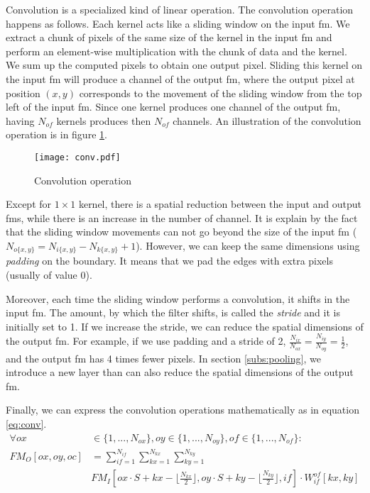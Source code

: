 Convolution is a specialized kind of linear operation. The convolution operation happens as follows. Each kernel acts like a sliding window on the input \acrshort{fm}. We extract a chunk of pixels of the same size of the kernel in the input \acrshort{fm} and perform an element-wise multiplication with the chunk of data and the kernel. We sum up the computed pixels to obtain one output pixel. Sliding this kernel on the input \acrshort{fm} will produce a channel of the output \acrshort{fm}, where the output pixel at position $(x, y)$ corresponds to the movement of the sliding window from the top left of the input \acrshort{fm}. Since one kernel produces one channel of the output \acrshort{fm}, having $N_{of}$ kernels produces then $N_{of}$ channels. An illustration of the convolution operation is in figure \ref{fig:convolution}.
%
\begin{figure}
    \centering
    \texttt{[image: conv.pdf]}
    \caption{Convolution operation}
    \label{fig:convolution}
\end{figure}

Except for $1 \times 1$ kernel, there is a spatial reduction between the input and output \acrshort{fm}s, while there is an increase in the number of channel. It is explain by the fact that the sliding window movements can not go beyond the size of the input \acrshort{fm} ($N_{o\{x,y\}} = N_{i\{x,y\}} - N_{k\{x,y\}} + 1$). However, we can keep the same dimensions using \textit{padding} on the boundary. It means that we pad the edges with extra pixels (usually of value 0).

Moreover, each time the sliding window performs a convolution, it shifts in the input \acrshort{fm}. The amount, by which the filter shifts, is called the \textit{stride} and it is initially set to 1. If we increase the stride, we can reduce the spatial dimensions of the output \acrshort{fm}. For example, if we use padding and a stride of 2, $\frac{N_{ix}}{N_{ox}} = \frac{N_{iy}}{N_{oy}} = \frac{1}{2}$, and the output \acrshort{fm} has 4 times fewer pixels. In section \ref{subs:pooling}, we introduce a new layer than can also reduce the spatial dimensions of the output \acrshort{fm}.

Finally, we can express the convolution operations mathematically as in equation \eqref{eq:conv}.
%
\begin{equation}
    \begin{split}
        \forall ox &\in \{ 1, ..., N_{ox} \}, oy \in \{ 1, ..., N_{oy} \}, of \in \{ 1, ..., N_{of} \} : \\
        FM_O[ox, oy, oc] &= \sum^{N_{if}}_{if=1}
        \sum^{N_{kx}}_{kx=1}
        \sum^{N_{ky}}_{ky=1} \\
        &FM_I[ox \cdot S + kx - \lfloor \frac{N_{kx}}{2} \rfloor,  oy \cdot S + ky - \lfloor \frac{N_{ky}}{2} \rfloor, if] \cdot
        W^{of}_{if}[kx, ky]
    \end{split}
    \label{eq:conv}
\end{equation}

